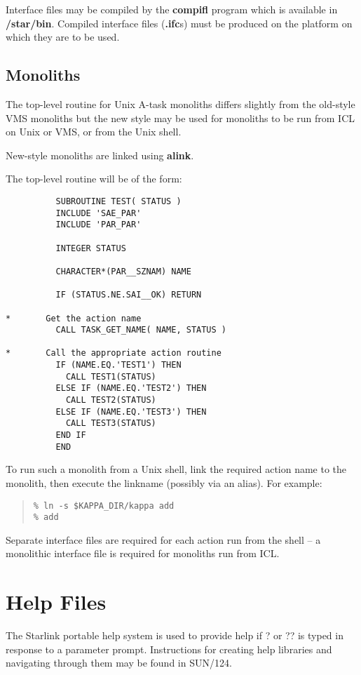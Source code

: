 Interface files may be compiled by the {\bf compifl} program which is available
in {\bf /star/bin}. Compiled interface files ({\bf .ifc}s) must be produced
on the platform on which they are to be used.

\subsection{Monoliths}
\label{monoliths}
The top-level routine for Unix A-task monoliths differs slightly from the 
old-style VMS monoliths but the new style may be used for monoliths to be run 
from ICL on Unix or VMS, or from the Unix shell.

New-style monoliths are linked using {\bf alink}.

The top-level routine will be of the form:
\begin{small}
\begin{verbatim}
          SUBROUTINE TEST( STATUS )
          INCLUDE 'SAE_PAR'
          INCLUDE 'PAR_PAR'

          INTEGER STATUS

          CHARACTER*(PAR__SZNAM) NAME

          IF (STATUS.NE.SAI__OK) RETURN

*       Get the action name
          CALL TASK_GET_NAME( NAME, STATUS )

*       Call the appropriate action routine
          IF (NAME.EQ.'TEST1') THEN
            CALL TEST1(STATUS)
          ELSE IF (NAME.EQ.'TEST2') THEN
            CALL TEST2(STATUS)
          ELSE IF (NAME.EQ.'TEST3') THEN
            CALL TEST3(STATUS)
          END IF
          END
\end{verbatim}
\end{small}

To run such a monolith from a Unix shell, link the required action name to the
monolith, then execute the linkname (possibly via an alias). For example:

\begin{quote} \begin{verbatim}
% ln -s $KAPPA_DIR/kappa add
% add
\end{verbatim} \end{quote}

Separate interface files are required for each action run from the shell --
a monolithic interface file is required for monoliths run from ICL.

\section{Help Files}
\label{hlp}
The Starlink portable help system is used to provide help if ? or ?? is typed 
in response to a parameter prompt.
Instructions for creating help libraries and navigating through them may be 
found in SUN/124.

